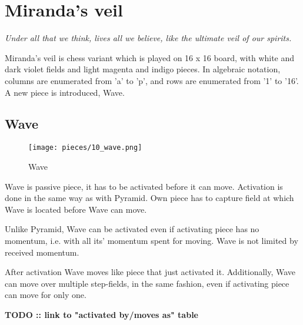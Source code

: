 
\chapter*{Miranda's veil}

\begin{flushright}
\parbox{0.8\textwidth}{
\emph{Under all that we think, lives all we believe, like the ultimate veil of our spirits. \\
 } }
\end{flushright}

\noindent
Miranda's veil is chess variant which is played on 16 x 16 board, with
white and dark violet fields and light magenta and indigo pieces. In
algebraic notation, columns are enumerated from 'a' to 'p', and rows
are enumerated from '1' to '16'. A new piece is introduced, Wave.

\clearpage %

\section*{Wave}

\noindent
\begin{wrapfigure}[12]{l}{0.4\textwidth}
\texttt{[image: pieces/10\_wave.png]}
\caption{Wave}
\label{fig:10_wave}
\end{wrapfigure}
Wave is passive piece, it has to be activated before it can move.
Activation is done in the same way as with Pyramid. Own piece
has to capture field at which Wave is located before Wave can
move.

Unlike Pyramid, Wave can be activated even if activating piece
has no momentum, i.e. with all its' momentum spent for moving.
Wave is not limited by received momentum.

After activation Wave moves like piece that just activated it.
Additionally, Wave can move over multiple step-fields, in the same
fashion, even if activating piece can move for only one.

\textbf{\huge{TODO :: link to "activated by/moves as" table}} %

